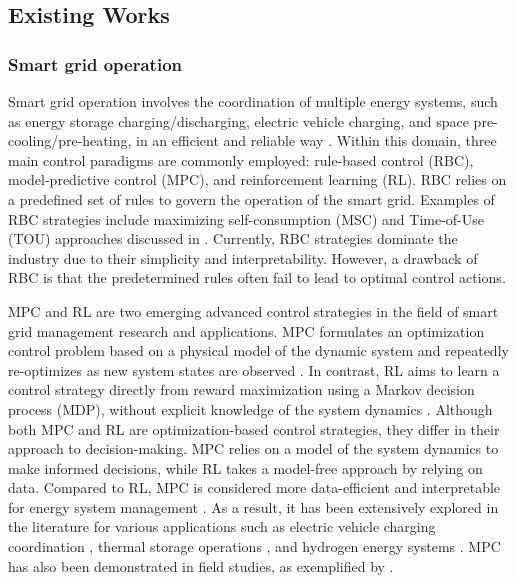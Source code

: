 \subsection{Existing Works}

\subsubsection{Smart grid operation }

Smart grid operation involves the coordination of multiple energy systems, such as energy storage charging/discharging, electric vehicle charging, and space pre-cooling/pre-heating, in an efficient and reliable way \cite{dong2023modeling}. Within this domain, three main control paradigms are commonly employed: rule-based control (RBC), model-predictive control (MPC), and reinforcement learning (RL). RBC relies on a predefined set of rules to govern the operation of the smart grid. Examples of RBC strategies include maximizing self-consumption (MSC) and Time-of-Use (TOU) approaches discussed in \cite{zou2022comparative}. Currently, RBC strategies dominate the industry due to their simplicity and interpretability. However, a drawback of RBC is that the predetermined rules often fail to lead to optimal control actions.

MPC and RL are two emerging advanced control strategies in the field of smart grid management research and applications. MPC formulates an optimization control problem based on a physical model of the dynamic system and repeatedly re-optimizes as new system states are observed \cite{hu2021model}. In contrast, RL aims to learn a control strategy directly from reward maximization using a Markov decision process (MDP), without explicit knowledge of the system dynamics \cite{wang2020reinforcement}. Although both MPC and RL are optimization-based control strategies, they differ in their approach to decision-making. MPC relies on a model of the system dynamics to make informed decisions, while RL takes a model-free approach by relying on data. Compared to RL, MPC is considered more data-efficient and interpretable for energy system management \cite{wang2023comparison}. As a result, it has been extensively explored in the literature for various applications such as electric vehicle charging coordination \cite{shi2018model}, thermal storage operations \cite{tang2019model}, and hydrogen energy systems \cite{RenewMG_reduc_DC}. MPC has also been demonstrated in field studies, as exemplified by \cite{MPC_insitu}.

